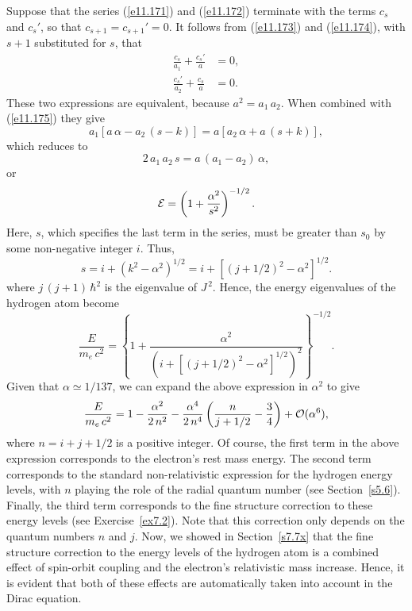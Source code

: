 Suppose that the series (\ref{e11.171}) and (\ref{e11.172})  terminate with the terms $c_s$ and $c_s'$, so that $c_{s+1}=c_{s+1}'=0$. It
follows from (\ref{e11.173}) and (\ref{e11.174}), with $s+1$ substituted for $s$, that
\begin{align}
\frac{c_s}{a_1} + \frac{c_s'}{a}&=0,\\[0.5ex]
\frac{c_s'}{a_2} + \frac{c_s}{a} &=0.
\end{align}
These two expressions are equivalent, because $a^2=a_1\,a_2$. When combined with (\ref{e11.175}) they give
\begin{equation}
a_1\left[a\,\alpha-a_2\,(s-k)\right] = a\left[a_2\,\alpha+a\,(s+k)\right],
\end{equation}
which reduces to
\begin{equation}
2\,a_1\,a_2\,s = a\,(a_1-a_2)\,\alpha,
\end{equation}
or
\begin{equation}
{\cal E} = \left(1+\frac{\alpha^2}{s^2}\right)^{-1/2}.
\end{equation}
Here,  $s$, which specifies the last term in the series, must be greater than $s_0$ by some non-negative integer $i$. Thus,
\begin{equation}
s = i+ (k^2-\alpha^2)^{1/2}= i+[(j+1/2)^2-\alpha^2]^{1/2}.
\end{equation}
where $j\,(j+1)\,\hbar^2$ is the eigenvalue of $J^{\,2}$. Hence, the energy eigenvalues of the hydrogen atom become
\begin{equation}
\frac{E}{m_e\,c^2} =\left\{1 + \frac{\alpha^2}{\left(i+[(j+1/2)^2-\alpha^2]^{1/2}\right)^2}\right\}^{-1/2}.
\end{equation}
Given that $\alpha\simeq 1/137$, we can expand the above expression in $\alpha^2$ to give
\begin{equation}
\frac{E}{m_e\,c^2} = 1 - \frac{\alpha^2}{2\,n^2}- \frac{\alpha^4}{2\,n^4}\left(\frac{n}{j+1/2}-\frac{3}{4}\right)+{\cal O}(\alpha^6),
\end{equation}
where $n= i + j+1/2$ is a positive integer. Of course, the first term in the above expression corresponds to the electron's
rest mass energy. The second term corresponds to the standard non-relativistic expression for the hydrogen energy levels, with $n$ playing the role
of the radial quantum number (see Section~\ref{s5.6}). 
Finally, the third term corresponds to the fine structure correction to these energy levels (see Exercise~\ref{ex7.2}).
Note that this correction only depends on the quantum numbers $n$ and $j$. Now, we showed in Section~\ref{s7.7x} that the fine structure correction to
the energy levels of the hydrogen atom is a combined effect of spin-orbit coupling and the electron's relativistic mass increase. Hence,
it is evident that both of these effects are automatically taken into account in the Dirac equation. 

